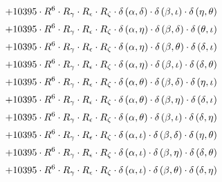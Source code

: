 \begin{subequations}
\begin{gather}
 \\[0.2em] \notag 		 + 10395 \cdot R^{6} \cdot R_{\gamma{}} \cdot R_{\epsilon{}} \cdot R_{\zeta{}} \cdot \delta{}\left(\alpha{}, \delta{}\right) \cdot \delta{}\left(\beta{}, \iota{}\right) \cdot \delta{}\left(\eta{}, \theta{}\right) 
 \\[0.2em] \notag 		 + 10395 \cdot R^{6} \cdot R_{\gamma{}} \cdot R_{\epsilon{}} \cdot R_{\zeta{}} \cdot \delta{}\left(\alpha{}, \eta{}\right) \cdot \delta{}\left(\beta{}, \delta{}\right) \cdot \delta{}\left(\theta{}, \iota{}\right) 
 \\[0.2em] \notag 		 + 10395 \cdot R^{6} \cdot R_{\gamma{}} \cdot R_{\epsilon{}} \cdot R_{\zeta{}} \cdot \delta{}\left(\alpha{}, \eta{}\right) \cdot \delta{}\left(\beta{}, \theta{}\right) \cdot \delta{}\left(\delta{}, \iota{}\right) 
 \\[0.2em] \notag 		 + 10395 \cdot R^{6} \cdot R_{\gamma{}} \cdot R_{\epsilon{}} \cdot R_{\zeta{}} \cdot \delta{}\left(\alpha{}, \eta{}\right) \cdot \delta{}\left(\beta{}, \iota{}\right) \cdot \delta{}\left(\delta{}, \theta{}\right) 
 \\[0.2em] \notag 		 + 10395 \cdot R^{6} \cdot R_{\gamma{}} \cdot R_{\epsilon{}} \cdot R_{\zeta{}} \cdot \delta{}\left(\alpha{}, \theta{}\right) \cdot \delta{}\left(\beta{}, \delta{}\right) \cdot \delta{}\left(\eta{}, \iota{}\right) 
 \\[0.2em] \notag 		 + 10395 \cdot R^{6} \cdot R_{\gamma{}} \cdot R_{\epsilon{}} \cdot R_{\zeta{}} \cdot \delta{}\left(\alpha{}, \theta{}\right) \cdot \delta{}\left(\beta{}, \eta{}\right) \cdot \delta{}\left(\delta{}, \iota{}\right) 
 \\[0.2em] \notag 		 + 10395 \cdot R^{6} \cdot R_{\gamma{}} \cdot R_{\epsilon{}} \cdot R_{\zeta{}} \cdot \delta{}\left(\alpha{}, \theta{}\right) \cdot \delta{}\left(\beta{}, \iota{}\right) \cdot \delta{}\left(\delta{}, \eta{}\right) 
 \\[0.2em] \notag 		 + 10395 \cdot R^{6} \cdot R_{\gamma{}} \cdot R_{\epsilon{}} \cdot R_{\zeta{}} \cdot \delta{}\left(\alpha{}, \iota{}\right) \cdot \delta{}\left(\beta{}, \delta{}\right) \cdot \delta{}\left(\eta{}, \theta{}\right) 
 \\[0.2em] \notag 		 + 10395 \cdot R^{6} \cdot R_{\gamma{}} \cdot R_{\epsilon{}} \cdot R_{\zeta{}} \cdot \delta{}\left(\alpha{}, \iota{}\right) \cdot \delta{}\left(\beta{}, \eta{}\right) \cdot \delta{}\left(\delta{}, \theta{}\right) 
 \\[0.2em] \notag 		 + 10395 \cdot R^{6} \cdot R_{\gamma{}} \cdot R_{\epsilon{}} \cdot R_{\zeta{}} \cdot \delta{}\left(\alpha{}, \iota{}\right) \cdot \delta{}\left(\beta{}, \theta{}\right) \cdot \delta{}\left(\delta{}, \eta{}\right) 

\end{gather}
\end{subequations}
